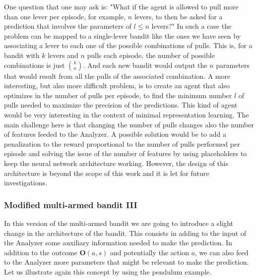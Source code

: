 \documentclass[11pt,a4paper,twoside]{report}
\newcommand{\+}{\textnormal{+} }
\theoremstyle{definition}
\numberwithin{equation}{chapter}
\begin{document}
    One question that one may ask is: "What if the agent is allowed to pull more
    than one lever per episode, for example, $n$ levers, to then be asked for a
    prediction that involves the parameters of $l\leq n$ levers?" In such a case
    the problem can be mapped to a single-lever bandit like the ones we have
    seen by associating a lever to each one of the possible combinations of
    pulls. This is, for a bandit with $k$ levers and $n$ pulls each episode, the
    number of possible combinations is just $k\choose n$.  And each new bandit
    would output the $n$ parameters that would result from all the pulls of the
    associated combination. A more interesting, but also more difficult problem,
    is to create an agent that also optimizes in the number of pulls per
    episode, to find the minimum number $l$ of pulls needed to maximize the
    precision of the predictions. This kind of agent would be very interesting
    in the context of minimal representation learning. The main challenge here
    is that changing the number of pulls changes also the number of features
    feeded to the Analyzer. A possible solution would be to add a penalization
    to the reward proportional to the number of pulls performed per episode and
    solving the issue of the number of features by using placeholders to keep
    the neural network architecture working. However, the design of this
    architecture is beyond the scope of this work and it is let for future
    investigations.

  \subsubsection{Modified multi-armed bandit III}

  In this version of the multi-armed bandit we are going to introduce a 
  slight change in the architecture of the bandit. This consists in adding
  to the input of the Analyzer some auxiliary information needed to make
  the prediction. In addition to the outcome $\textbf{O}(a,s)$ and potentially
  the action $a$, we can also feed to the Analyzer more parameters that 
  might be relevant to make the prediction. Let us illustrate again this
  concept by using the pendulum example.
\end{document}
